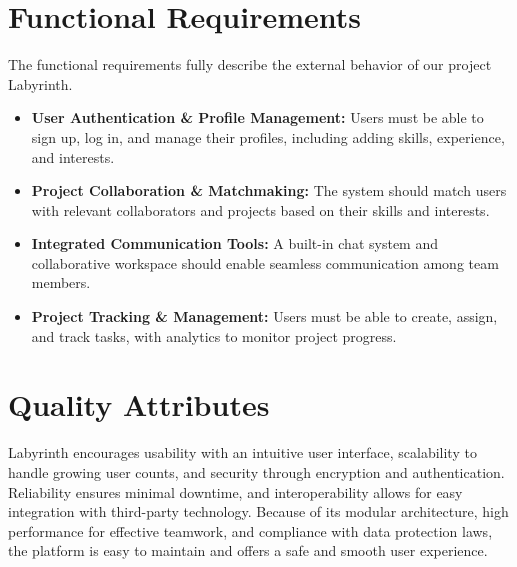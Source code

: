\documentclass{FastFyp}
\begin{document}
\section{Functional Requirements}
The functional requirements fully describe the external behavior of our project Labyrinth.
\begin{itemize}
    \item \textbf{User Authentication \& Profile Management:} Users must be able to sign up, log in, and manage their profiles, including adding skills, experience, and interests.
    \item \textbf{Project Collaboration \& Matchmaking:} The system should match users with relevant collaborators and projects based on their skills and interests.
    \item \textbf{Integrated Communication Tools:} A built-in chat system and collaborative workspace should enable seamless communication among team members.
    \item \textbf{Project Tracking \& Management:} Users must be able to create, assign, and track tasks, with analytics to monitor project progress.
\end{itemize}
\section{Quality Attributes}
Labyrinth encourages usability with an intuitive user interface, scalability to handle growing user counts, and security through encryption and authentication.   Reliability ensures minimal downtime, and interoperability allows for easy integration with third-party technology.   Because of its modular architecture, high performance for effective teamwork, and compliance with data protection laws, the platform is easy to maintain and offers a safe and smooth user experience.
\end{document}
